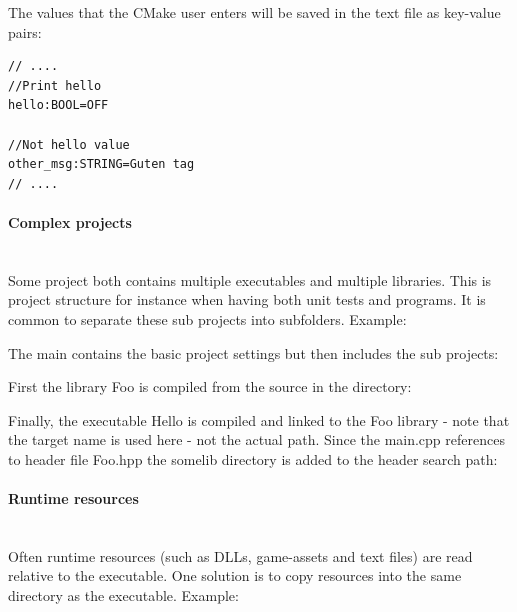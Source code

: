 \documentclass[11pt,a4paper,landscape]{scrartcl} %
\newcommand{\sectiontitle}[1]{\paragraph{#1} \ \\} %
\begin{document}
\begin{multicols}{2}
The values that the CMake user enters will be saved in the text file  as key-value pairs:

\begin{lstlisting}[language=bash]
// ....
//Print hello
hello:BOOL=OFF

//Not hello value
other_msg:STRING=Guten tag
// ....
\end{lstlisting}

\sectiontitle{Complex projects}

Some project both contains multiple executables and multiple libraries. This is project structure for instance when having both unit tests and programs. It is common to separate these sub projects into subfolders. Example:

\vspace{\baselineskip} %
\noindent{}

\vspace{\baselineskip} %

The main  contains the basic project settings but then includes the sub projects:



First the library Foo is compiled from the source in the   directory:



Finally, the executable Hello is compiled and linked to the Foo library - note that the target name is used here - not the actual path. Since the main.cpp references to header file Foo.hpp the somelib directory is added to the header search path:



\sectiontitle{Runtime resources}

Often runtime resources (such as DLLs, game-assets and text files) are read relative to the executable. One solution is to copy resources into the same directory as the executable. Example:


\end{multicols}
\end{document}
